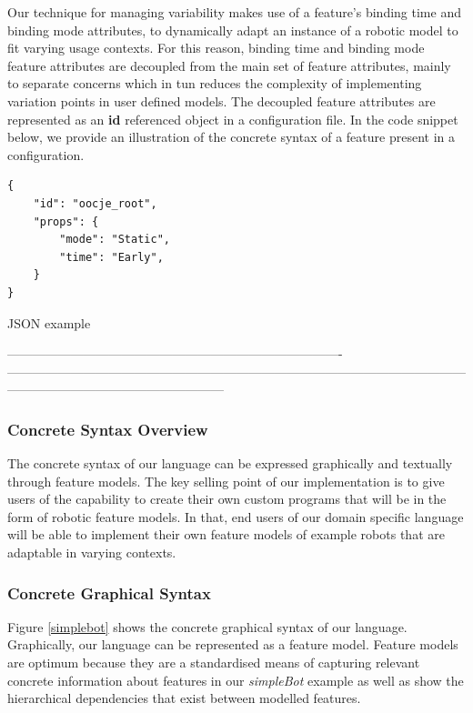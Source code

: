 Our technique for managing variability makes use of a feature's binding time and binding mode attributes, to dynamically adapt an instance of a robotic model to fit varying usage contexts. For this reason, binding time and binding mode feature attributes are decoupled from the main set of feature attributes, mainly to separate concerns which in tun reduces the complexity of implementing variation points in user defined models. The decoupled feature attributes are represented as an \textbf{id} referenced object in a configuration file. In the code snippet below, we provide an illustration of the concrete syntax of a feature present in a configuration.

\begin{listing}
\begin{verbatim}
{
    "id": "oocje_root",
    "props": {
        "mode": "Static",
        "time": "Early",
    }
}
\end{verbatim}
\caption{JSON example} 
\label{json-example}
\end{listing}
-------------------------------------------------------------------------------
---------------------------------------------------------------------------------------------------------------------------------------------------------------

\subsubsection{Concrete Syntax Overview}
The concrete syntax of our language can be expressed graphically and textually through feature models. The key selling point of our implementation is to give users of the capability to create their own custom programs that will be in the form of robotic feature models. In that, end users of our domain specific language will be able to implement their own feature models of example robots that are adaptable in varying contexts.
\subsubsection{Concrete Graphical Syntax}
Figure \ref{simplebot} shows the concrete graphical syntax of our language. Graphically, our language can be represented as a feature model. Feature models are optimum because they are a standardised means of capturing relevant concrete information about features in our \textit{simpleBot} example as well as show the hierarchical dependencies that exist between modelled features. 

